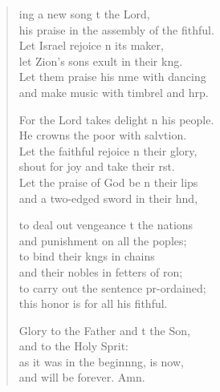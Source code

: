 \begin{verse}
  \begin{patverse}
    ing a new song t the Lord,\Med\\
his praise in the assembly of the fithful.\\
Let Israel rejoice \pointup{\i}n its maker,\Med\\
let Zion’s sons exult in their k\pointup{\i}ng.\\
Let them praise his nme with dancing\Med\\
and make music with timbrel and hrp.

For the Lord takes delight \pointup{\i}n his people.\Med\\
He crowns the poor with salvtion.\\
Let the faithful rejoice \pointup{\i}n their glory,\Med\\
shout for joy and take their rst.\\
Let the praise of God be n their lips\Med\\
and a two-edged sword in their hnd,

to deal out vengeance t the nations\Med\\
and punishment on all the poples;\\
to bind their k\pointup{\i}ngs in chains\Med\\
and their nobles in fetters of \pointup{\i}ron;\\
to carry out the sentence pr-ordained;\Med\\
this honor is for all his fithful.

Glory to the Father and t the Son,\Med\\
and to the Holy Sp\pointup{\i}rit:\\
as it was in the beginn\pointup{\i}ng, is now,\Med\\
and will be forever. Amn.
  \end{patverse}
\end{verse}
